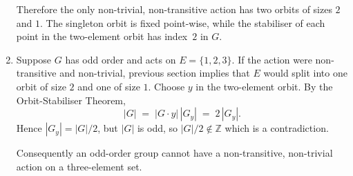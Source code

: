 \documentclass[12pt]{article}
\begin{document}
\begin{enumerate}[label=(\arabic*)]
Therefore the only non-trivial, non-transitive action has two orbits
of sizes \(2\) and \(1\). The singleton orbit is fixed point-wise, while
the stabiliser of each point in the two-element orbit has index~\(2\) in
\(G\).

\item
Suppose \(G\) has odd order and acts on \(E=\{1,2,3\}\).
If the action were non-transitive and non-trivial, previous section implies that \(E\) would split into
one orbit of size \(2\) and one of size \(1\).
Choose \(y\) in the two-element orbit.
By the Orbit-Stabiliser Theorem,
\[
|G| \;=\; |G\!\cdot\!y|\,|G_{y}| \;=\; 2\,|G_{y}|.
\]
Hence \(|G_{y}| = |G|/2\), but \(|G|\) is odd, so \(|G|/2\notin\mathbb Z\) which is a contradiction.

Consequently an odd-order group cannot have a non-transitive, non-trivial action on a three-element set.
\end{enumerate}
\end{document}

